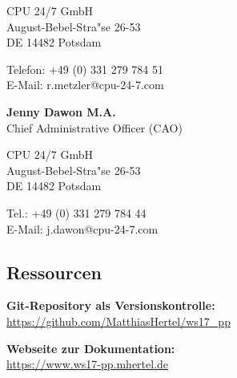 \documentclass[12pt]{article}
\begin{document}
CPU 24/7 GmbH \\
August-Bebel-Stra"se 26-53\\
DE 14482 Potsdam

Telefon: +49 (0) 331 279 784 51 \\
E-Mail: r.metzler@cpu-24-7.com

\textbf{Jenny Dawon M.A.}\\
Chief Administrative Officer (CAO)

CPU 24/7 GmbH\\
August-Bebel-Stra"se 26-53\\
DE 14482 Potsdam

Tel.: +49 (0) 331 279 784 44\\
E-Mail: j.dawon@cpu-24-7.com

\subsection{Ressourcen}
\textbf{Git-Repository als Versionskontrolle:}\\
\url{https://github.com/MatthiasHertel/ws17_pp}

\textbf{Webseite zur Dokumentation:}\\
\url{https://www.ws17-pp.mhertel.de}



\clearpage
\setlength\bibitemsep{10pt}
\printbibliography[heading=bibintoc, title=Quellenverzeichnis]
\newpage
{}
{}
\listoffigures
\newpage

%



\end{document}
